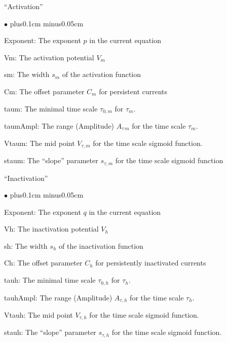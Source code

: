 \documentclass{article}
\newenvironment{myitem}{\begin{list}{$\bullet$}{\setlength{\leftmargin}{1.1em}
\itemsep0.1cm plus0.1cm minus0.05cm
\listparindent0cm
\addtolength{\labelsep}{0.5\labelsep}
\setlength{\labelwidth}{0.8em}
\setlength{\leftmargin}{\labelwidth}
\addtolength{\leftmargin}{\labelsep}
}}{\end{list}}
\begin{document}
\noindent
``Activation''
\begin{myitem}
\item Exponent: The exponent $p$ in the current equation
\item Vm: The activation potential $V_m$
\item sm: The width $s_m$ of the activation function
\item Cm: The offset parameter $C_m$ for persistent currents 
\item taum: The minimal time scale $\tau_{0,m}$ for $\tau_m$.
\item taumAmpl: The range (Amplitude) $A_{\tau\,m}$ for the time scale $\tau_m$.
\item Vtaum: The mid point $V_{\tau,m}$ for the time scale sigmoid function.
\item staum: The ``slope'' parameter $s_{\tau,m}$ for the time scale
sigmoid function  
\end{myitem}
``Inactivation''
\begin{myitem}
\item Exponent: The exponent $q$ in the current equation
\item Vh: The inactivation potential $V_h$
\item sh: The width $s_h$ of the inactivation function
\item Ch: The offset parameter $C_h$ for persistently inactivated currents 
\item tauh: The minimal time scale $\tau_{0,h}$ for $\tau_h$.
\item tauhAmpl: The range (Amplitude) $A_{\tau,h}$ for the time scale $\tau_h$.
\item Vtauh: The mid point $V_{\tau,h}$ for the time scale sigmoid function.
\item stauh: The ``slope'' parameter $s_{\tau,h}$ for the time scale
sigmoid function.  
\end{myitem}
\end{document}
